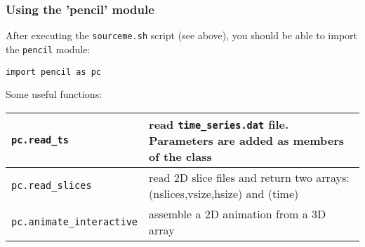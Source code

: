 \documentclass[a4paper,12pt]{article}
\begin{document}
\subsubsection{Using the 'pencil' module}
After executing the \verb|sourceme.sh| script (see above), you should be able to import the \verb|pencil| module:

\begin{verbatim}
import pencil as pc
\end{verbatim}

Some useful functions:
\begin{center}
\begin{tabular}{|l|l|}\hline
\verb|pc.read_ts| & read \verb|time_series.dat| file. Parameters are added as members of the class\\\hline
\verb|pc.read_slices| & read 2D slice files and return two arrays: (nslices,vsize,hsize) and (time)\\\hline
\verb|pc.animate_interactive| & assemble a 2D animation from a 3D array\\\hline
\end{tabular}
\end{center}


% 
\end{document}
